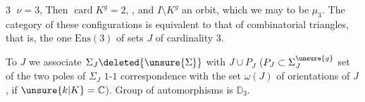 \textcircled{3} \(\nu=3\), Then  \(\operatorname{card}K^g=2\), , and \(I\setminus K^g\)  an orbit,
which we may  to be \(\mu_3\). The category of these configurations is equivalent to that of combinatorial triangles, that is, the one \(\mathrm{Ens}(3)\) of sets \(J\) of cardinality \(3\).

To \(J\) we associate \(\Sigma_J\deleted{\unsure{\Sigma}}\) with \(J\cup P_J\) (\(P_J\subset\Sigma_J^{\unsure{g}}\) set of the two poles of \(\Sigma_J\)  \(1\)-\(1\) correspondence with the set \(\omega(J)\) of orientations of \(J\), if \(\unsure{k|K}=\mathbb C\)). Group of automorphisms is \(\mathbb D_3\).

